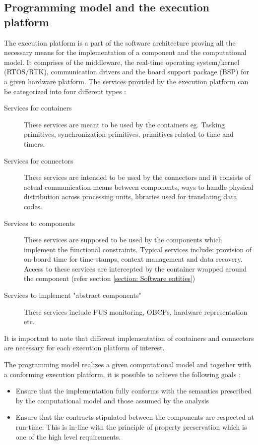 \subsection{Programming model and the execution platform}
\label{section: Execution platform}
The execution platform is a part of the software architecture proving all the necessary means for the implementation of a component and the computational model. It comprises of the middleware, the real-time operating system/kernel (RTOS/RTK), communication drivers and the board support package (BSP) for a given hardware platform. The services provided by the execution platform can be categorized into four different types \cite{SAVOIR}:

\begin{description}
\item [Services for containers] These services are meant to be used by the containers eg. Tasking primitives, synchronization primitives, primitives related to time and timers.

\item [Services for connectors] These services are intended to be used by the connectors and it consists of actual communication means between components, ways to handle physical distribution across processing units, libraries used for translating data codes.

\item [Services to components] These services are supposed to be used by the components which implement the functional constraints. Typical services include: provision of on-board time for time-stamps, context management and data recovery. Access to these services are intercepted by the container wrapped around the component (refer section \cref{section: Software entities})

\item [Services to implement "abstract components"] These services include PUS monitoring, OBCPs, hardware representation etc.
\end{description}

It is important to note that different implementation of containers and connectors are necessary for each execution platform of interest.

The programming model realizes a given computational model and together with a conforming execution platform, it is possible to achieve the following goals \cite{PhdThesis}:

\begin{itemize}
\item Ensure that the implementation fully conforms with the semantics prescribed by the computational model and those assumed by the analysis
\item Ensure that the contracts stipulated between the components are respected at run-time. This is in-line with the principle of property preservation which is one of the high level requirements.
\end{itemize} 

